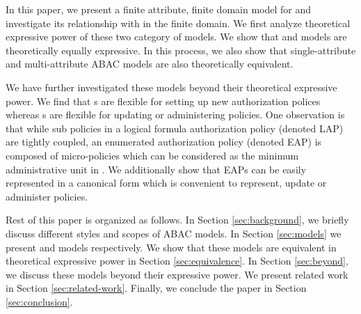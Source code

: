 
In this paper, we present a finite attribute, finite domain model for \EPModels{} and investigate its relationship with \LPModels{} in the finite domain. We first analyze theoretical expressive power of these two category of models. We show that \LPModels{} and \EPModels{} models are theoretically equally expressive. In this process, we also show that single-attribute and multi-attribute ABAC models are also theoretically equivalent. 

We have further investigated these models beyond their theoretical expressive power.  We find that \LPModels{}s are flexible for setting up new authorization polices whereas \EPModels{}s are flexible for updating or administering policies. One observation is that while sub policies in a logical formula authorization policy (denoted  LAP) are tightly coupled, an enumerated authorization policy (denoted EAP) is composed of micro-policies which can be considered as the minimum administrative unit in \EPModels{}.  We additionally show that EAPs can be easily  represented in a canonical form which is convenient to represent, update or administer policies. 

Rest of this paper is organized as follows. In Section \ref{sec:background}, we briefly discuss different styles and scopes of ABAC models. In Section \ref{sec:models}  we present \EPModels{} and \LPModels{} models respectively. We show that these models are equivalent in theoretical expressive power in Section \ref{sec:equivalence}. In Section \ref{sec:beyond}, we discuss these models beyond their expressive power. We present related work in Section \ref{sec:related-work}. Finally, we conclude the paper in Section \ref{sec:conclusion}. 